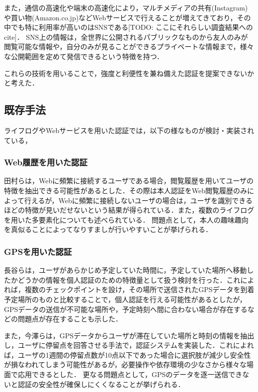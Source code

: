 また，通信の高速化や端末の高速化により，マルチメディアの共有(Instagram)や買い物(Amazon.co.jp)などWebサービスで行えることが増えてきており，その中でも特に利用率が高いのはSNSである[TODO: ここにそれらしい調査結果へのcite]．
SNS上の情報は，全世界に公開されるパブリックなものから友人のみが閲覧可能な情報や，自分のみが見ることができるプライベートな情報まで，様々な公開範囲を定めて発信できるという特徴を持つ．

これらの技術を用いることで，強度と利便性を兼ね備えた認証を提案できないかと考えた．

\subsection{既存手法}\label{sec:lifeLogAuth}
ライフログやWebサービスを用いた認証では，以下の様なものが検討・実装されている，

\subsubsection{Web履歴を用いた認証}\label{subsec:webHistoryAuth}
田村ら\cite{田村健範:2011-07-14}は，Webに頻繁に接続するユーザである場合，閲覧履歴を用いてユーザの特徴を抽出できる可能性があるとした．その際は本人認証をWeb閲覧履歴のみによって行えるが，Webに頻繁に接続しないユーザの場合は，ユーザを識別できるほどの特徴が見いだせないという結果が得られている．また，複数のライフログを用いた多要素化についても述べられている．
問題点として，本人の趣味趣向を真似ることによってなりすましが行いやすいことが挙げられる．

\subsubsection{GPSを用いた認証}\label{subsec:gpsAuth}
長谷ら\cite{長谷容子:2004-08-20}は，ユーザがあらかじめ予定していた時間に，予定していた場所へ移動したかどうかの情報を個人認証のための特徴量として扱う検討を行った．これによれば，複数のチェックポイントを設け，その場所で送信されたGPSデータを到着予定場所のものと比較することで，個人認証を行える可能性があるとしたが，GPSデータの送信が不可能な場所や，予定時刻へ間に合わない場合が存在するなどの問題点が存在することも示した．

また，今澤ら\cite{imazawa:2008-10-08}は，GPSデータからユーザが滞在していた場所と時刻の情報を抽出し，ユーザに停留点を回答させる手法で，認証システムを実装した．これによれば，ユーザの1週間の停留点数が10点以下であった場合に選択肢が減少し安全性が損なわれてしまう可能性があるが，必要操作や依存環境の少なさから様々な場面で応用できるとした．
更なる問題点として，GPSのデータを逐一送信できないと認証の安全性が確保しにくくなることが挙げられる．

